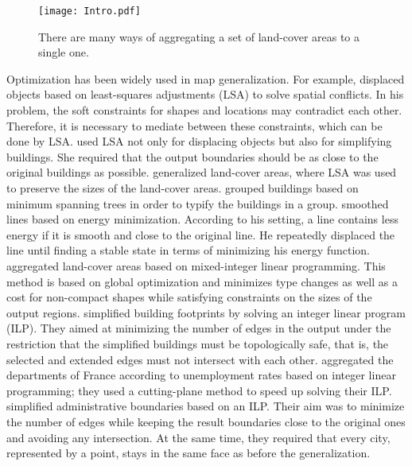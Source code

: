 
\begin{figure}[tb]
\centering
\texttt{[image: Intro.pdf]}
\caption{There are many ways of aggregating 
a set of land-cover areas to a single one.}
\label{fig:Intro_SubdivisionName}
\end{figure}

Optimization has been widely used in map generalization.
For example, \textcite{Harrie1999} displaced objects 
based on least-squares adjustments (LSA)
to solve spatial conflicts.
In his problem, the soft constraints 
for shapes and locations may contradict each other.
Therefore, it is necessary 
to mediate between these constraints, 
which can be done by LSA.
\textcite{Sester2005Optimization} used LSA not only for 
displacing objects but also for simplifying buildings. 
She required that 
the output boundaries should be 
as close to the original buildings as possible.
\textcite{Tong2015AreaLSA} generalized land-cover areas,
where LSA was used to preserve the sizes of 
the land-cover areas.
\textcite{Regnauld2001} grouped buildings based on 
minimum spanning trees in order to typify
the buildings in a group.
\textcite{Burghardt2005Snakes} smoothed lines based on 
energy minimization. 
According to his setting, a line contains less energy
if it is smooth and close to the original line.
He repeatedly displaced the line 
until finding a stable state 
in terms of minimizing his energy function.
\textcite{HaunertWolff2010AreaAgg} aggregated land-cover areas
based on mixed-integer linear programming.
This method is based on global optimization and minimizes 
type changes as well as a cost for non-compact shapes 
while satisfying constraints on the sizes of the output regions.
\textcite{Haunertwolff2010Building} simplified building
footprints by solving an integer linear program (ILP).
They aimed at minimizing the number of edges in the output 
under the restriction that 
the simplified buildings must be topologically safe,
that is, the selected and extended edges must not intersect with 
each other.
\textcite{Oehrlein2017Aggregation} aggregated the departments 
of France according to unemployment rates based on integer 
linear programming; they used a cutting-plane method to 
speed up solving their ILP.
\textcite{Funke2017Simplification} simplified 
administrative boundaries based on an ILP.
Their aim was to minimize the number of edges
while keeping the result boundaries close to the original ones
and avoiding any intersection. 
At the same time, they required that every city, 
represented by a point, 
stays in the same face as before the generalization.



